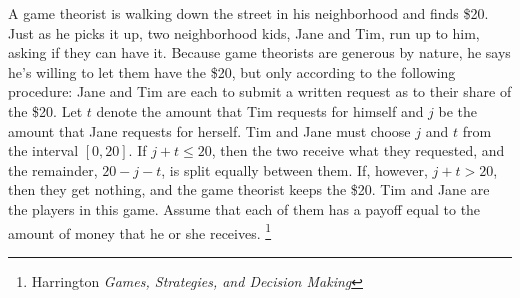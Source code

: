\documentclass[addpoints]{exam}
\begin{document}
\begin{questions}

\newpage

\question
A game theorist is walking down the street in his neighborhood and finds \$20.
Just as he picks it up, two neighborhood kids, 
Jane and Tim,
run up to him, asking if they can have it.
Because game theorists are generous by nature, 
he says he's willing to let them have the \$20,
but only according to the following procedure:
Jane and Tim are each to submit a written request 
as to their share of the \$20. 
Let $t$ denote the amount that Tim requests for himself
and $j$ be the amount that Jane requests for herself.
Tim and Jane must choose $j$ and $t$ from the interval
$[0,20]$.
If $j + t \leq 20$, then the two receive what they requested,
and the remainder, $20 - j - t$, is split equally between them.
If, however, $j + t > 20$, then they get nothing, and the game theorist keeps the \$20.
Tim and Jane are the players in this game.
Assume that each of them has a payoff equal to the amount of money that he or she receives. 
\footnote{Harrington \textit{Games, Strategies, and Decision Making}}

\end{questions}
\end{document}
